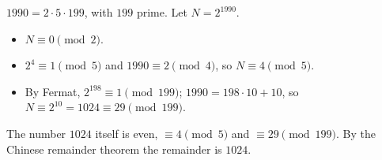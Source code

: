 $1990=2\cdot5\cdot199$, with $199$ prime. Let $N=2^{1990}$.
\begin{itemize}
\item $N\equiv0\pmod2$.
\item $2^4\equiv1\pmod5$ and $1990\equiv2\pmod4$, so $N\equiv4\pmod5$.
\item By Fermat, $2^{198}\equiv1\pmod{199}$; $1990=198\cdot10+10$, so $N\equiv2^{10}=1024\equiv29\pmod{199}$.
\end{itemize}
The number $1024$ itself is even, $\equiv4\pmod5$ and $\equiv29\pmod{199}$. By the Chinese remainder theorem the remainder is $\boxed{1024}$.
